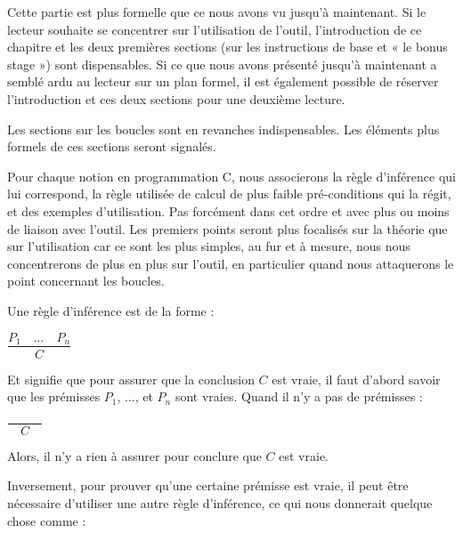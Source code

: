 \documentclass[middle]{zmdocument}
\begin{document}


\begin{Information}
Cette partie est plus formelle que ce nous avons vu jusqu'à maintenant. Si le 
lecteur souhaite se concentrer sur l'utilisation de l'outil, l'introduction de
ce chapitre et les deux premières sections (sur les instructions de base et « le 
bonus stage ») sont dispensables. Si ce que nous avons présenté jusqu'à maintenant
a semblé ardu au lecteur sur un plan formel, il est également possible de réserver 
l'introduction et ces deux sections pour une deuxième lecture.

Les sections sur les boucles sont en revanches indispensables. Les éléments plus
formels de ces sections seront signalés.
\end{Information}


Pour chaque notion en programmation C, nous associerons la règle d'inférence qui 
lui correspond, la règle utilisée de calcul de plus faible pré-conditions qui la 
régit, et des exemples d'utilisation. Pas forcément dans cet ordre et avec plus ou 
moins de liaison avec l'outil. Les premiers points seront plus focalisés sur la
théorie que sur l'utilisation car ce sont les plus simples, au fur et à mesure,
nous nous concentrerons de plus en plus sur l'outil, en particulier quand nous 
attaquerons le point concernant les boucles.





Une règle d'inférence est de la forme :




\begin{center}
$\dfrac{P_1 \quad ... \quad P_n}{C}$


\end{center}


Et signifie que pour assurer que la conclusion $C$ est vraie, il faut d'abord
savoir que les prémisses $P_1$, ..., et $P_n$ sont vraies. Quand il n'y a
pas de prémisses :




\begin{center}
$\dfrac{}{\quad C \quad}$


\end{center}


Alors, il n'y a rien à assurer pour conclure que $C$ est vraie.



Inversement, pour prouver qu'une certaine prémisse est vraie, il peut être nécessaire 
d'utiliser une autre règle d'inférence, ce qui nous donnerait quelque
chose comme :
\end{document}
